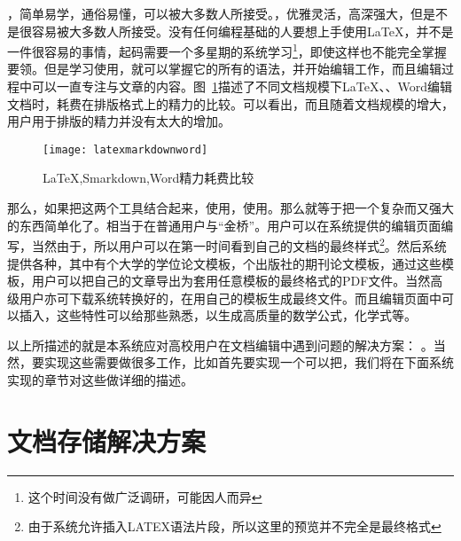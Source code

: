 ，简单易学，通俗易懂，可以被大多数人所接受。，优雅灵活，高深强大，但是不是很容易被大多数人所接受。没有任何编程基础的人要想上手使用\LaTeX，并不是一件很容易的事情，起码需要一个多星期的系统学习\footnote{这个时间没有做广泛调研，可能因人而异}，即使这样也不能完全掌握要领。但是学习使用，就可以掌握它的所有的语法，并开始编辑工作，而且编辑过程中可以一直专注与文章的内容。图~\ref{fig:xfig7}描述了不同文档规模下\LaTeX、\smarkdown、Word编辑文档时，耗费在排版格式上的精力的比较。可以看出，而且随着文档规模的增大，用户用于排版的精力并没有太大的增加。
\begin{figure}[H]
  \centering
  \texttt{[image: latexmarkdownword]}
  \caption{LaTeX,Smarkdown,Word精力耗费比较}
  \label{fig:xfig7}
\end{figure}
那么，如果把这两个工具结合起来，使用，使用。那么就等于把一个复杂而又强大的东西简单化了。相当于在普通用户与“金桥”。用户可以在系统提供的编辑页面编写，当然由于，所以用户可以在第一时间看到自己的文档的最终样式\footnote{由于系统允许插入LATEX语法片段，所以这里的预览并不完全是最终格式}。然后系统提供各种，其中有个大学的学位论文模板，个出版社的期刊论文模板，通过这些模板，用户可以把自己的文章导出为套用任意模板的最终格式的PDF文件。当然高级用户亦可下载系统转换好的，在用自己的模板生成最终文件。而且编辑页面中可以插入，这些特性可以给那些熟悉，以生成高质量的数学公式，化学式等。

以上所描述的就是本系统应对高校用户在文档编辑中遇到问题的解决方案： 。当然，要实现这些需要做很多工作，比如首先要实现一个可以把，我们将在下面系统实现的章节对这些做详细的描述。


\section{文档存储解决方案}
\label{sec:save}

